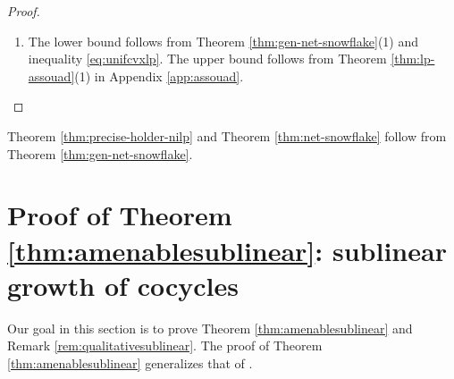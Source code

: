 \documentclass[11pt,reqno]{amsart}
\newcommand{\1}{\mathbf 1}
\begin{document}
\begin{proof}
\begin{enumerate}
\begin{align*}
&\ge \frac {c_1^{1-\varepsilon}}4 \left(\frac{\rho}{\varepsilon q}\left[\left(8r_1r_2^{-\varepsilon}D\log K\right)^{-\varepsilon q/\left(1-\varepsilon\right)}/c_1^{-\varepsilon q}-\left(R/2\right)^{-\varepsilon q}\right]\right)^{1/q}\mu\left(B_{R/2}\right)^{1/q}.
\end{align*}
Thus by Theorem \ref{thm:cvx} with $p=q$, and \eqref{eq:phi-cheeger-ub},
\[
\frac {c_1^{1-\varepsilon}}4 \left(\frac{\rho}{\varepsilon q}\left[\left(8r_1r_2^{-\varepsilon}D\log K\right)^{-\varepsilon q/\left(1-\varepsilon\right)}/c_1^{-\varepsilon q}-\left(R/2\right)^{-\varepsilon q}\right]\right)^{1/q}\mu\left(B_{R/2}\right)^{1/q}\lesssim K_q\left(X\right)\left(\rho+\frac{1}{\rho-1}\right)\sqrt{k}r_2^{-\varepsilon}D\left(\log K\right) \mu\left(B_{2R}\right)^{1/q},
\]
which by the doubling condition implies
\[
c_1^{1-\varepsilon} \left(\frac{\rho}{\varepsilon q}\left[\left(8r_1r_2^{-\varepsilon}D\log K\right)^{-\varepsilon q/\left(1-\varepsilon\right)}/c_1^{-\varepsilon q}-\left(R/2\right)^{-\varepsilon q}\right]\right)^{1/q}\lesssim K_q\left(X\right)\left(\rho+\frac{1}{\rho-1}\right)\sqrt{k}r_2^{-\varepsilon}DK^{2/q}\log K,
\]
Since $R>0$ was arbitrarily large,
\[
\frac{c_1\rho^{1/q}}{\varepsilon^{1/q} }\left(8r_1r_2^{-\varepsilon}D\log K\right)^{-\varepsilon /\left(1-\varepsilon\right)}\lesssim K_q\left(X\right)\left(\rho+\frac{1}{\rho-1}\right)\sqrt{k}r_2^{-\varepsilon}D K^{2/q}\log K.
\]
It follows that
\[
D\gtrsim \left(\frac{c_1^{1-\varepsilon}\left(r_2/r_1\right)^{\varepsilon}\rho^{\left(1-\varepsilon\right)/q}}{k^{\left(1-\varepsilon\right)/2}\left(\rho+\frac{1}{\rho-1}\right)^{1-\varepsilon} K^{2\left(1-\varepsilon\right)/q}\log K}\right)\frac{1}{K_q\left(X\right)^{1-\varepsilon}\varepsilon^{1/q}}.
\]
\item The lower bound follows from Theorem \ref{thm:gen-net-snowflake}(1) and inequality \eqref{eq:unifcvxlp}. The upper bound follows from Theorem \ref{thm:lp-assouad}(1) in Appendix \ref{app:assouad}.
\end{enumerate}
\end{proof}
Theorem \ref{thm:precise-holder-nilp} and Theorem \ref{thm:net-snowflake} follow from Theorem \ref{thm:gen-net-snowflake}.




\section{Proof of Theorem \ref{thm:amenablesublinear}: sublinear growth of cocycles}\label{sec:amenable}
Our goal in this section is to prove Theorem \ref{thm:amenablesublinear} and Remark \ref{rem:qualitativesublinear}. The proof of Theorem \ref{thm:amenablesublinear} generalizes that of \cite{austin2013sharp}.
\end{document}

